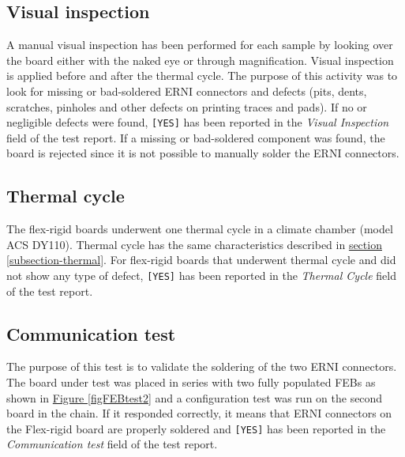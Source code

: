 \subsection{Visual inspection}
A manual visual inspection has been performed for each sample by looking over the board either with the naked eye or through magnification. Visual inspection is applied before and after the thermal cycle. The purpose of this activity was to look for missing or bad-soldered ERNI connectors and defects (pits, dents, scratches, pinholes and other defects on printing traces and pads). If no or negligible defects were found, \texttt{[YES]} has been reported in the \textit{Visual Inspection} field of the test report. If a missing or bad-soldered component was found, the board is rejected since it is not possible to manually solder the ERNI connectors.

\subsection{Thermal cycle}
The flex-rigid boards underwent one thermal cycle in a climate chamber (model ACS DY110). Thermal cycle has the same characteristics described in \hyperref[subsection-thermal]{section \ref{subsection-thermal}}. For flex-rigid boards that underwent thermal cycle and did not show any type of defect, \texttt{[YES]} has been reported in the \textit{Thermal Cycle} field of the test report.

\subsection{Communication test}
The purpose of this test is to validate the soldering of the two ERNI connectors. The board under test was placed in series with two fully populated FEBs as shown in \hyperref[figFEBtest2]{Figure \ref{figFEBtest2}} and a configuration test was run on the second board in the chain. If it responded correctly, it means that ERNI connectors on the Flex-rigid board are properly soldered and \texttt{[YES]} has been reported in the \textit{Communication test} field of the test report. \\

